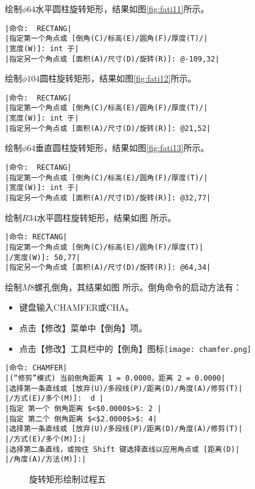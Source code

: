 \begin{procedure}
绘制$\phi 64$水平圆柱旋转矩形，结果如图\ref{fig:fati11}所示。
\begin{lstlisting}
|命令:  RECTANG|
|指定第一个角点或 [倒角(C)/标高(E)/圆角(F)/厚度(T)/|
|宽度(W)]: int 于|
|指定另一个角点或 [面积(A)/尺寸(D)/旋转(R)]: @-109,32|
\end{lstlisting}
绘制$\phi 104$圆柱旋转矩形，结果如图\ref{fig:fati12}所示。
\begin{lstlisting}
|命令:  RECTANG|
|指定第一个角点或 [倒角(C)/标高(E)/圆角(F)/厚度(T)/|
|宽度(W)]: int 于|
|指定另一个角点或 [面积(A)/尺寸(D)/旋转(R)]: @21,52|
\end{lstlisting}
绘制$\phi 64$垂直圆柱旋转矩形，结果如图\ref{fig:fati13}所示。
\begin{lstlisting}
|命令:  RECTANG|
|指定第一个角点或 [倒角(C)/标高(E)/圆角(F)/厚度(T)/|
|宽度(W)]: int 于|
|指定另一个角点或 [面积(A)/尺寸(D)/旋转(R)]: @32,77|
\end{lstlisting}
绘制$R34$水平圆柱旋转矩形，结果如图 所示。
\begin{lstlisting}
|命令: RECTANG|
|指定第一个角点或 [倒角(C)/标高(E)/圆角(F)/厚度(T)|
|/宽度(W)]: 50,77|
|指定另一个角点或 [面积(A)/尺寸(D)/旋转(R)]: @64,34|
\end{lstlisting}
绘制$M8$螺孔倒角，其结果如图 所示。倒角命令的启动方法有：
\begin{itemize}
\item 键盘输入CHAMFER或CHA。
\item 点击【修改】菜单中【倒角】项。
\item 点击【修改】工具栏中的【倒角】图标\texttt{[image: chamfer.png]}
\end{itemize}
\begin{lstlisting}
|命令: CHAMFER|
|(“修剪”模式) 当前倒角距离 1 = 0.0000，距离 2 = 0.0000|
|选择第一条直线或 [放弃(U)/多段线(P)/距离(D)/角度(A)/修剪(T)|
|/方式(E)/多个(M)]:  d |
|指定 第一个 倒角距离 $<$0.0000$>$: 2 |
|指定 第二个 倒角距离 $<$2.0000$>$: 4|
|选择第一条直线或 [放弃(U)/多段线(P)/距离(D)/角度(A)/修剪(T)|
|/方式(E)/多个(M)]:|
|选择第二条直线，或按住 Shift 键选择直线以应用角点或 [距离(D)|
|/角度(A)/方法(M)]:|
\end{lstlisting}
\begin{figure}[htbp]
\centering
{}\hspace{30pt}
\caption{旋转矩形绘制过程五}
\end{figure}

\end{procedure}
\endinput
